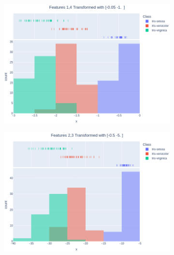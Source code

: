 \documentclass[14pt,a4]{article}
\begin{document}
\begin{figure}[h]
    \centering
    \begin{subfigure}{0.32\linewidth}
        \centering
        \includegraphics[width=\linewidth]{images/q3/p5/14T1.png}
    \end{subfigure}
    \hfill
    \begin{subfigure}{0.32\linewidth}
        \centering
        \includegraphics[width=\linewidth]{images/q3/p5/23T2.png}
    \end{subfigure}
    \hfill
    \begin{subfigure}{0.32\linewidth}
        \centering

\end{subfigure}
\end{figure}
\end{document}

